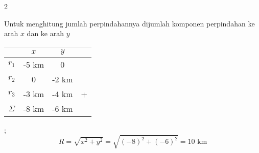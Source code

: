 \documentclass[10pt]{article}
\begin{document}
\begin{multicols*} {2}
\begin{enumerate}[itemsep=0mm]
{Untuk menghitung jumlah perpindahannya dijumlah komponen perpindahan ke arah $x$ dan ke arah $y$
\begin{tabular}{cccc}
\hline
 & $x$ & $y$ &\\ \hline
$r_1$ & -5 km & 0& \\ \hline
$r_2$ & 0 & -2 km& \\ \hline
$r_3$ & -3 km & -4 km & + \\ \hline
$\Sigma$ & -8 km & -6 km & \\ \hline
\end{tabular}
\vspace{1cm};
$$ R = \sqrt{x^2+y^2}=\sqrt{(-8)^2+(-6)^2}=10 \text { km}$$
}
\end{enumerate}
\end{multicols*}
\end{document}
